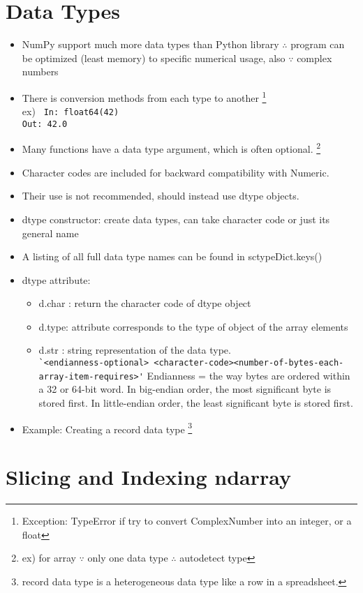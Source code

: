 \documentclass[12 pt , twoside, letterpaper] {article}
\begin{document}
\section {Data Types}
\begin{itemize}
\item NumPy support much more data types than Python library $\therefore$ program can be optimized (least memory) to specific numerical usage, also $\because$ complex numbers
\item There is conversion methods from each type to another \footnote{Exception: TypeError if try to convert ComplexNumber  into an integer, or a float }
\\ ex) \verb! In: float64(42)!
\\ \verb !Out: 42.0!
\item Many functions have a data type argument, which is often optional. \footnote{ex) for array $\because$ only one data type $\therefore$ autodetect type}
\item  Character codes are included for backward compatibility with Numeric. 
\item Their use is not recommended, should instead use dtype objects.
\item dtype constructor: create data types, can take character code or just its general name
\item A listing of all full data type names can be found in sctypeDict.keys()
\item dtype attribute:
\begin{itemize}
\item d.char : return the character code of dtype object
\item  d.type: attribute corresponds to the type of object of the array elements
\item d.str : string representation of the data type. \\ \verb!`<endianness-optional> <character-code><number-of-bytes-each-array-item-requires>'! Endianness = the way bytes are ordered within a 32 or 64-bit word. In big-endian order, the most significant byte is stored first. In little-endian order, the least significant byte is stored first.

\end{itemize}
\item Example: Creating a record data type \footnote{record data type is a heterogeneous data type like a row in a spreadsheet.}
\end{itemize}
\section{Slicing and Indexing ndarray}
\end{document}
